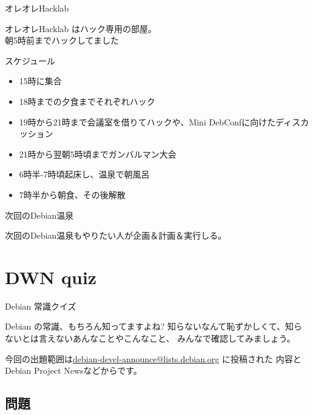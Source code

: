 \begin{frame}{オレオレHacklab}

オレオレHacklab はハック専用の部屋。\\
朝5時前までハックしてました
\begin{center}
\end{center}
\end{frame}

\begin{frame}{スケジュール}

\begin{itemize}
\item 15時に集合
\item 18時までの夕食までそれぞれハック
\item 19時から21時まで会議室を借りてハックや、Mini DebConfに向けたディスカッション
\item 21時から翌朝5時頃までガンバルマン大会
\item 6時半-7時頃起床し、温泉で朝風呂
\item 7時半から朝食、その後解散
\end{itemize}
\end{frame}

\begin{frame}{次回のDebian温泉}

次回のDebian温泉もやりたい人が企画＆計画＆実行しる。

\end{frame}


\section{DWN quiz}
\begin{frame}{Debian 常識クイズ}

Debian の常識、もちろん知ってますよね?
知らないなんて恥ずかしくて、知らないとは言えないあんなことやこんなこと、
みんなで確認してみましょう。

今回の出題範囲は\url{debian-devel-announce@lists.debian.org} に投稿された
内容とDebian Project Newsなどからです。

\end{frame}

\subsection{問題}



